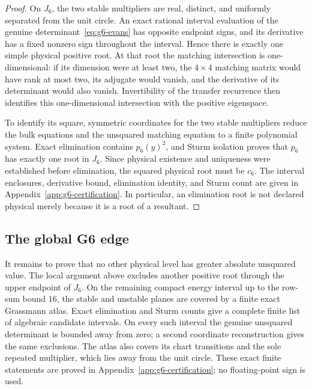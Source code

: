 \begin{proof}
On \(J_6\), the two stable multipliers are real, distinct, and uniformly
separated from the unit circle.  An exact rational interval evaluation of
the genuine determinant~\eqref{eq:g6-evans} has opposite endpoint signs,
and its derivative has a fixed nonzero sign throughout the interval.
Hence there is exactly one simple physical positive root.
At that root the matching intersection is one-dimensional: if its dimension
were at least two, the \(4\times4\) matching matrix would have rank at most
two, its adjugate would vanish, and the derivative of its determinant would
also vanish.  Invertibility of the transfer recurrence then identifies this
one-dimensional intersection with the positive eigenspace.

To identify its square, symmetric coordinates for the two stable
multipliers reduce the bulk equations and the unsquared matching equation
to a finite polynomial system.  Exact elimination contains
\(p_6(y)^2\), and Sturm isolation proves that \(p_6\) has exactly one root in
\(J_6\).  Since physical existence and uniqueness were established before
elimination, the squared physical root must be \(c_6\).  The interval
enclosures, derivative bound, elimination identity, and Sturm count are
given in Appendix~\ref{app:g6-certification}.  In particular, an elimination
root is not declared physical merely because it is a root of a resultant.
\end{proof}

\subsection{The global G6 edge}
\label{subsec:global-g6-edge}

It remains to prove that no other physical level has greater absolute
unsquared value.  The local argument above excludes another positive root
through the upper endpoint of \(J_6\).  On the remaining compact energy
interval up to the row-sum bound \(16\), the stable and unstable planes are
covered by a finite exact Grassmann atlas.  Exact elimination and Sturm
counts give a complete finite list of algebraic candidate intervals.
On every such interval the genuine unsquared determinant is bounded away
from zero; a second coordinate reconstruction gives the same exclusions.
The atlas also covers its chart transitions and the sole repeated
multiplier, which lies away from the unit circle.  These exact finite
statements are proved in Appendix~\ref{app:g6-certification}; no
floating-point sign is used.

